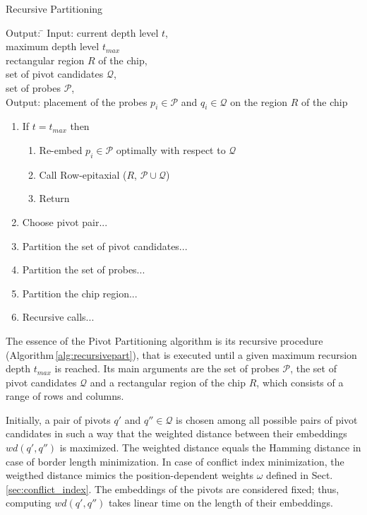 \documentclass[runningheads]{llncs}
\begin{document}
\begin{algorithm}
\caption{Recursive Partitioning}
\label{alg:recursivepart}
\begin{minipage}{4.8in}

\begin{tabbing}
Output: \=									\kill
Input:  \> current depth level $t$,						\\
        \> maximum depth level $t_{max}$					\\
        \> rectangular region $R$ of the chip,					\\
        \> set of pivot candidates $\mathcal{Q}$,				\\
        \> set of probes $\mathcal{P}$,						\\
Output: \> placement of the probes $p_i \in \mathcal{P}$ and
           $q_i \in \mathcal{Q}$ on the region $R$ of the chip
\end{tabbing}

\begin{enumerate}
\item If $t = t_{max}$ then
  \begin{enumerate}
    \item Re-embed $p_i \in \mathcal{P}$ optimally with respect to $\mathcal{Q}$
    \item Call Row-epitaxial ($R$, $\mathcal{P} \cup \mathcal{Q}$)
    \item Return
  \end{enumerate}
\item Choose pivot pair...
\item Partition the set of pivot candidates...
\item Partition the set of probes...
\item Partition the chip region...
\item Recursive calls...
\end{enumerate}

\end{minipage}
\end{algorithm}

The essence of the Pivot Partitioning algorithm is its recursive procedure
(Algorithm\,\ref{alg:recursivepart}), that is executed until a given maximum
recursion depth $t_{max}$ is reached. Its main arguments are the set of probes
$\mathcal{P}$, the set of pivot candidates $\mathcal{Q}$ and a rectangular region
of the chip $R$, which consists of a range of rows and columns.

Initially, a pair of pivots $q'$ and $q'' \in \mathcal{Q}$ is chosen among all
possible pairs of pivot candidates in such a way that the weighted distance between
their embeddings $wd(q', q'')$ is maximized. The weighted distance equals the
Hamming distance in case of border length minimization. In case of conflict index
minimization, the weigthed distance mimics the position-dependent weights $\omega$
defined in Sect.\,\ref{sec:conflict_index}. The embeddings of the pivots are
considered fixed; thus, computing $wd(q', q'')$ takes linear time on the length
of their embeddings.
\end{document}

